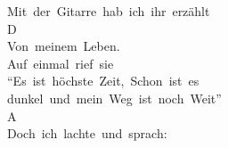 \documentclass[]{book}
\begin{document}
Mit~der~Gitarre~hab~ich~ihr~erzählt\\
\hspace*{0.333em}\hspace*{0.333em}\hspace*{0.333em}\hspace*{0.333em}\hspace*{0.333em}\hspace*{0.333em}\hspace*{0.333em}\hspace*{0.333em}\hspace*{0.333em}\hspace*{0.333em}\hspace*{0.333em}\hspace*{0.333em}D\\
Von~meinem~Leben.\\
Auf~einmal~rief~sie\\
``Es~ist~höchste~Zeit,~Schon~ist~es~\\
dunkel~und~mein~Weg~ist~noch~Weit''\\
\hspace*{0.333em}\hspace*{0.333em}\hspace*{0.333em}\hspace*{0.333em}\hspace*{0.333em}\hspace*{0.333em}\hspace*{0.333em}\hspace*{0.333em}\hspace*{0.333em}\hspace*{0.333em}\hspace*{0.333em}A\\
Doch~ich~lachte~und~sprach:\\
\end{document}
